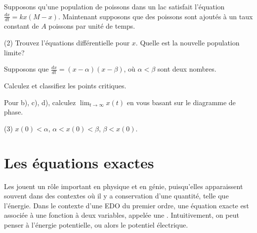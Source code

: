 \begin{exercise}
Supposons qu'une population de poissons dans un lac satisfait l'équation 
$\frac{dx}{dt} = kx(M-x)$.  Maintenant supposons que des poissons sont ajoutés à un taux constant de $A$ poissons par unité de temps.
\begin{tasks}(2)
\task Trouvez l'équations différentielle pour $x$.
\task Quelle est la nouvelle population limite?
\end{tasks}
\end{exercise}

\begin{exercise}
Supposons que $\frac{dx}{dt} = (x-\alpha)(x-\beta)$, où $\alpha <
\beta$ sont deux nombres.
\begin{tasks}
\task Calculez et classifiez les points critiques.
\end{tasks}
Pour b), c), d), calculez $\displaystyle \lim_{t\to\infty} x(t)$ en vous basant sur le diagramme de phase.
\begin{tasks}[resume](3)
\task $x(0) < \alpha$,
\task $\alpha < x(0) < \beta$,
\task $\beta < x(0)$.
\end{tasks}
\end{exercise}



\sectionnewpage
\section{Les équations exactes}
\label{exact:section}

Les \emph{} jouent un rôle important en physique et en génie, puisqu'elles apparaissent souvent dans des contextes où il y a conservation d'une quantité, telle que l'énergie.
Dans le contexte d'une EDO du premier ordre, une équation exacte est associée à une fonction à deux variables, appelée une \emph{}.  Intuitivement, on peut penser à l'énergie potentielle, ou alors le potentiel électrique.  

